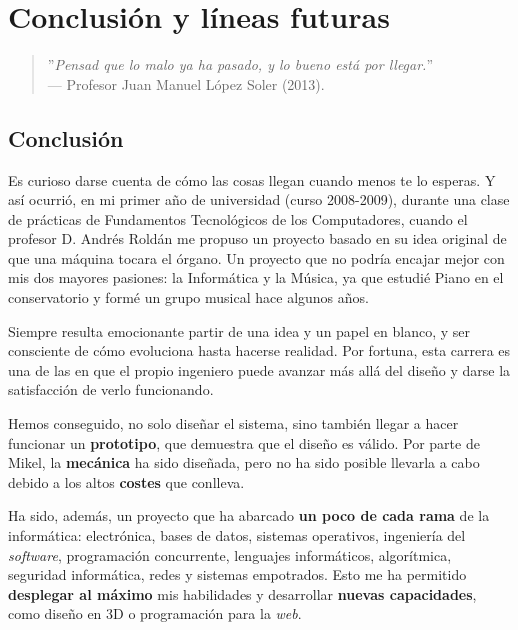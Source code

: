 \chapter{Conclusión y líneas futuras}
\label{cap:capitulo7}

\begin{quote}
	\begin{flushright}
		\small ''\textit{Pensad que lo malo ya ha pasado, y lo bueno está por llegar.}'' \\
		--- Profesor Juan Manuel López Soler (2013).
	\end{flushright}
\end{quote}

\newpage

\section{Conclusión}

Es curioso darse cuenta de cómo las cosas llegan cuando menos te lo esperas. Y así ocurrió, en mi primer año de universidad (curso 2008-2009), durante una clase de prácticas de Fundamentos Tecnológicos de los Computadores, cuando el profesor D. Andrés Roldán me propuso un proyecto basado en su idea original de que una máquina tocara el órgano. Un proyecto que no podría encajar mejor con mis dos mayores pasiones: la Informática y la Música, ya que estudié Piano en el conservatorio y formé un grupo musical hace algunos años.

Siempre resulta emocionante partir de una idea y un papel en blanco, y ser consciente de cómo evoluciona hasta hacerse realidad. Por fortuna, esta carrera es una de las en que el propio ingeniero puede avanzar más allá del diseño y darse la satisfacción de verlo funcionando.

Hemos conseguido, no solo diseñar el sistema, sino también llegar a hacer funcionar un \textbf{prototipo}, que demuestra que el diseño es válido. Por parte de Mikel, la \textbf{mecánica} ha sido diseñada, pero no ha sido posible llevarla a cabo debido a los altos \textbf{costes} que conlleva.

Ha sido, además, un proyecto que ha abarcado \textbf{un poco de cada rama} de la informática: electrónica, bases de datos, sistemas operativos, ingeniería del \textit{software}, programación concurrente, lenguajes informáticos, algorítmica, seguridad informática, redes y sistemas empotrados. Esto me ha permitido \textbf{desplegar al máximo} mis habilidades y desarrollar \textbf{nuevas capacidades}, como diseño en 3D o programación para la \textit{web}.

